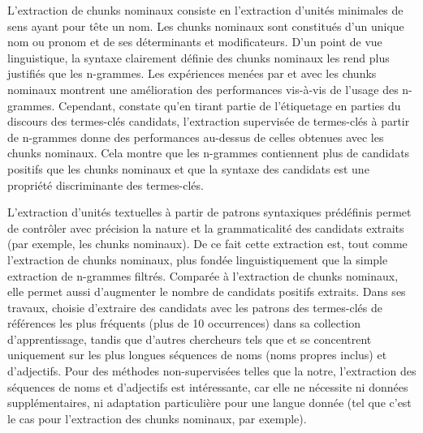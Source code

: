     L'extraction de chunks nominaux consiste en l'extraction d'unités
    minimales de sens ayant pour tête un nom. Les chunks nominaux sont
    constitués d'un unique nom ou pronom et de ses déterminants et
    modificateurs. D'un point de vue linguistique, la syntaxe clairement définie
    des chunks nominaux les rend plus justifiés que les n-grammes. Les
    expériences menées par  et
     avec les chunks nominaux montrent une
    amélioration des performances vis-à-vis de l'usage des n-grammes.
    Cependant,  constate qu'en tirant partie
    de l'étiquetage en parties du discours des termes-clés candidats,
    l'extraction supervisée de termes-clés à partir de n-grammes donne des
    performances au-dessus de celles obtenues avec les chunks nominaux. Cela
    montre que les n-grammes contiennent plus de candidats positifs que les
    chunks nominaux et que la syntaxe des candidats est une propriété
    discriminante des termes-clés.

    L'extraction d'unités textuelles à partir de patrons syntaxiques prédéfinis
    permet de contrôler avec précision la nature et la grammaticalité des
    candidats extraits (par exemple, les chunks nominaux). De ce fait cette
    extraction est, tout comme l'extraction de chunks nominaux, plus fondée
    linguistiquement que la simple extraction de n-grammes filtrés. Comparée à
    l'extraction de chunks nominaux, elle permet aussi d'augmenter le nombre de
    candidats positifs extraits. Dans ses travaux,
     choisie d'extraire des candidats avec
    les patrons des termes-clés de références les plus fréquents (plus de 10
    occurrences) dans sa collection d'apprentissage, tandis que d'autres
    chercheurs tels que  et
     se concentrent uniquement sur les plus
    longues séquences de noms (noms propres inclus) et d'adjectifs. Pour des
    méthodes non-supervisées telles que la notre, l'extraction des séquences de 
    noms et d'adjectifs est intéressante, car elle ne nécessite ni données
    supplémentaires, ni adaptation particulière pour une langue donnée (tel que
    c'est le cas pour l'extraction des chunks nominaux, par exemple).

